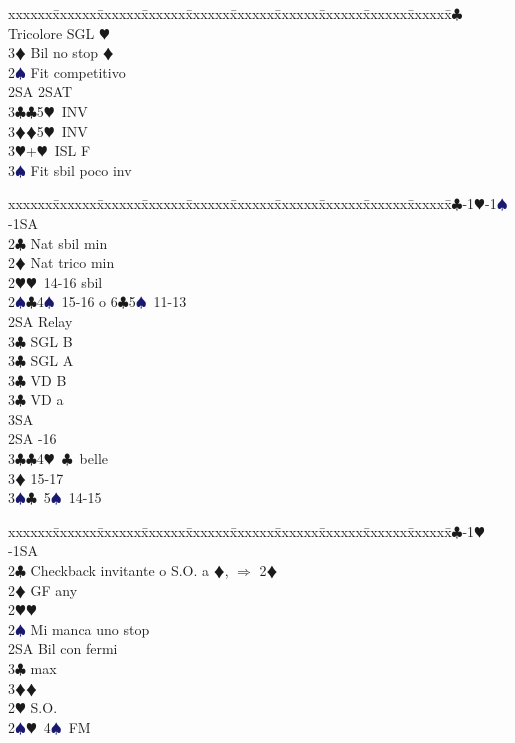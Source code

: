 \documentclass[a4paper,italian]{article}
\newcommand{\BC}{\textcolor{OliveGreen}{$\clubsuit$}}
\newcommand{\BD}{\textcolor{RedOrange}{$\vardiamondsuit$}}
\newcommand{\BH}{\textcolor{Red2}{$\varheartsuit${}}}
\newcommand{\BS}{\textcolor{MidnightBlue}{$\spadesuit${}}}
\newenvironment{bidtable}
{\begin{tabbing}

    xxxxxx\=xxxxxx\=xxxxxx\=xxxxxx\=xxxxxx\=xxxxxx\=xxxxxx\=xxxxxx\=xxxxxx\=xxxxxx\=\kill}
{\end{tabbing} }%
\begin{document}
\begin{multicols}{2}
\begin{bidtable}
        3\BC \> Tricolore SGL \BH \\
        3\BD \> Bil no stop \BD \-\\
        [2pt]2\BS \> Fit competitivo\\
        2SA \> 2SAT\\
        3\BC {}\BC 5\BH\ INV\\
        3\BD {}\BD 5\BH\ INV\\
        3\BH {}+\BH\ ISL F\\
        3\BS \> Fit sbil poco inv\-
    \end{bidtable}
    \vfill\null
    \columnbreak
    \begin{bidtable}
        1\BC-1\BH-1\BS-1SA\+\\
        2\BC \> Nat sbil min\\
        2\BD \> Nat trico min\\
        2\BH {}\BH\ 14-16 sbil\\
        2\BS {}\BC 4\BS\ 15-16 o 6\BC 5\BS\ 11-13\+\\
        2SA \> Relay\+\\
        3\BC {} SGL B\\
        3\BC {} SGL A\\
        3\BC {} VD B\\
        3\BC {} VD a\\
        3SA \-\-\\
        2SA -16\\
        3\BC {}\BC 4\BH\ \BC\ belle\\
        3\BD {} 15-17\\
        3\BS {}\BC\ 5\BS\ 14-15\-
    \end{bidtable}
    \bigbreak
    \begin{bidtable}
        1\BC-1\BH-1SA\+\\
        2\BC \> Checkback invitante o S.O. a \BD , $\Rightarrow$ 2\BD \\
        2\BD \> GF any\+\\
        2\BH {}\BH \\
        2\BS \> Mi manca uno stop\\
        2SA \> Bil con fermi\\
        3\BC {} max\\
        3\BD {}\BD \-\\
        [2pt]2\BH \> S.O.\\
        [2pt]2\BS {}\BH\ 4\BS\ FM\\

\end{bidtable}
\end{multicols}
\end{document}
